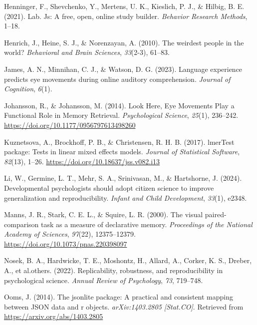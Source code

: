 \documentclass[
  man,floatsintext]{apa6}
\newlength{\cslhangindent}
\newenvironment{CSLReferences}[2] %
 {\begin{list}{}{%
  \setlength{\itemindent}{0pt}
  \setlength{\leftmargin}{0pt}
  \setlength{\parsep}{0pt}
  \ifodd #1
   \setlength{\leftmargin}{\cslhangindent}
   \setlength{\itemindent}{-1\cslhangindent}
  \fi
  \setlength{\itemsep}{#2\baselineskip}}}
 {\end{list}}
\begin{document}
\begin{CSLReferences}{1}{0}
Henninger, F., Shevchenko, Y., Mertens, U. K., Kieslich, P. J., \& Hilbig, B. E. (2021). Lab. Js: A free, open, online study builder. \emph{Behavior Research Methods}, 1--18.

Henrich, J., Heine, S. J., \& Norenzayan, A. (2010). The weirdest people in the world? \emph{Behavioral and Brain Sciences}, \emph{33}(2-3), 61--83.

James, A. N., Minnihan, C. J., \& Watson, D. G. (2023). Language experience predicts eye movements during online auditory comprehension. \emph{Journal of Cognition}, \emph{6}(1).

Johansson, R., \& Johansson, M. (2014). Look {Here}, {Eye Movements Play} a {Functional Role} in {Memory Retrieval}. \emph{Psychological Science}, \emph{25}(1), 236--242. \url{https://doi.org/10.1177/0956797613498260}

Kuznetsova, A., Brockhoff, P. B., \& Christensen, R. H. B. (2017). {lmerTest} package: Tests in linear mixed effects models. \emph{Journal of Statistical Software}, \emph{82}(13), 1--26. \url{https://doi.org/10.18637/jss.v082.i13}

Li, W., Germine, L. T., Mehr, S. A., Srinivasan, M., \& Hartshorne, J. (2024). Developmental psychologists should adopt citizen science to improve generalization and reproducibility. \emph{Infant and Child Development}, \emph{33}(1), e2348.

Manns, J. R., Stark, C. E. L., \& Squire, L. R. (2000). The visual paired-comparison task as a measure of declarative memory. \emph{Proceedings of the National Academy of Sciences}, \emph{97}(22), 12375--12379. \url{https://doi.org/10.1073/pnas.220398097}

Nosek, B. A., Hardwicke, T. E., Moshontz, H., Allard, A., Corker, K. S., Dreber, A., et al.others. (2022). Replicability, robustness, and reproducibility in psychological science. \emph{Annual Review of Psychology}, \emph{73}, 719--748.

Ooms, J. (2014). The jsonlite package: A practical and consistent mapping between JSON data and r objects. \emph{arXiv:1403.2805 {[}Stat.CO{]}}. Retrieved from \url{https://arxiv.org/abs/1403.2805}


\end{CSLReferences}
\end{document}
